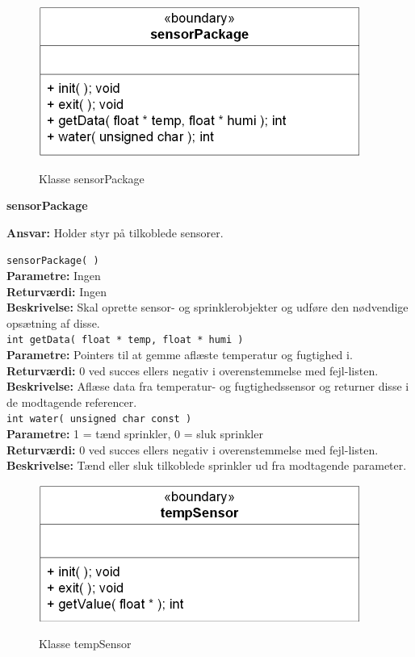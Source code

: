 
\begin{figure}[htbp] \centering
{\includegraphics[scale=1.3]{filer/design/Klassediagrammer/sw_psoc_sensorPackage}}
\caption{Klasse sensorPackage}
\label{fig:sw_psoc_class_sensorPackage}
\end{figure} 

{\centering
\textbf{sensorPackage}\par
}
\textbf{Ansvar:} Holder styr på tilkoblede sensorer. \

\verb+sensorPackage( ) +\\
\textbf{Parametre:} Ingen \\
\textbf{Returværdi:} Ingen \\
\textbf{Beskrivelse:} Skal oprette sensor- og sprinklerobjekter og udføre den nødvendige opsætning af disse. \\

\verb+int getData( float * temp, float * humi )+ \\
\textbf{Parametre:} Pointers til at gemme aflæste temperatur og fugtighed i. \\
\textbf{Returværdi:} 0 ved succes ellers negativ i overenstemmelse med fejl-listen. \\
\textbf{Beskrivelse:} Aflæse data fra temperatur- og fugtighedssensor og returner disse i de modtagende referencer. \\

\verb+int water( unsigned char const )+ \\
\textbf{Parametre:} 1 = tænd sprinkler, 0 = sluk sprinkler \\
\textbf{Returværdi:} 0 ved succes ellers negativ i overenstemmelse med fejl-listen. \\
\textbf{Beskrivelse:} Tænd eller sluk tilkoblede sprinkler ud fra modtagende parameter. \\


\begin{figure}[htbp] \centering
{\includegraphics[scale=1.3]{filer/design/Klassediagrammer/sw_psoc_tempSensor}}
\caption{Klasse tempSensor}
\label{fig:sw_psoc_class_tempSensor}
\end{figure} 

